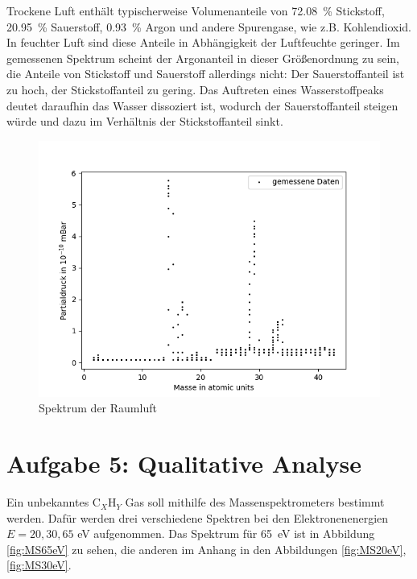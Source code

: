 Trockene Luft enthält typischerweise Volumenanteile von \SI{72.08}{\%} Stickstoff, \SI{20.95}{\%} Sauerstoff, \SI{0.93}{\%} Argon und andere Spurengase, wie z.B. Kohlendioxid\cite{Luft}. In feuchter Luft sind diese Anteile in Abhängigkeit der Luftfeuchte geringer. Im gemessenen Spektrum scheint der Argonanteil in dieser Größenordnung zu sein, die Anteile von Stickstoff und Sauerstoff allerdings nicht: Der Sauerstoffanteil ist zu hoch, der Stickstoffanteil zu gering. Das Auftreten eines Wasserstoffpeaks deutet daraufhin das Wasser dissoziert ist, wodurch der Sauerstoffanteil steigen würde und dazu im Verhältnis der Stickstoffanteil sinkt.


\begin{figure}[H]
    \centering
    \includegraphics[width=120mm,scale=0.8]{Massenspektrometer/include/MSzweitesSpektrum.png}
    \caption{Spektrum der Raumluft}
    \label{fig:MSzweitesSpektrum}
\end{figure}

\section{Aufgabe 5: Qualitative Analyse}
Ein unbekanntes $\text{C}_X\text{H}_Y$ Gas soll mithilfe des Massenspektrometers bestimmt werden. Dafür werden drei verschiedene Spektren bei den Elektronenenergien $E = {20,30,65} $ eV aufgenommen.
Das Spektrum für \SI{65}{eV} ist in Abbildung \ref{fig:MS65eV} zu sehen, die anderen im Anhang in den Abbildungen \ref{fig:MS20eV},\ref{fig:MS30eV}. 

